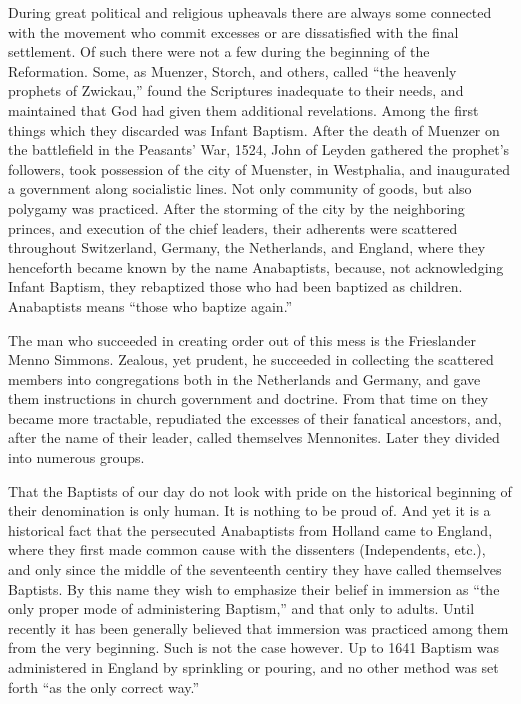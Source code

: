 \documentclass[
]{book}
\begin{document}
During great political and religious upheavals there are always some connected with the movement who commit excesses or are dissatisfied with the final settlement. Of such there were not a few during the beginning of the Reformation. Some, as Muenzer, Storch, and others, called ``the heavenly prophets of Zwickau,'' found the Scriptures inadequate to their needs, and maintained that God had given them additional revelations. Among the first things which they discarded was Infant Baptism. After the death of Muenzer on the battlefield in the Peasants' War, 1524, John of Leyden gathered the prophet's followers, took possession of the city of Muenster, in Westphalia, and inaugurated a government along socialistic lines. Not only community of goods, but also polygamy was practiced. After the storming of the city by the neighboring princes, and execution of the chief leaders, their adherents were scattered throughout Switzerland, Germany, the Netherlands, and England, where they henceforth became known by the name Anabaptists, because, not acknowledging Infant Baptism, they rebaptized those who had been baptized as children. Anabaptists means ``those who baptize again.''

The man who succeeded in creating order out of this mess is the Frieslander Menno Simmons. Zealous, yet prudent, he succeeded in collecting the scattered members into congregations both in the Netherlands and Germany, and gave them instructions in church government and doctrine. From that time on they became more tractable, repudiated the excesses of their fanatical ancestors, and, after the name of their leader, called themselves Mennonites. Later they divided into numerous groups.

That the Baptists of our day do not look with pride on the historical beginning of their denomination is only human. It is nothing to be proud of. And yet it is a historical fact that the persecuted Anabaptists from Holland came to England, where they first made common cause with the dissenters (Independents, etc.), and only since the middle of the seventeenth centiry they have called themselves Baptists. By this name they wish to emphasize their belief in immersion as ``the only proper mode of administering Baptism,'' and that only to adults. Until recently it has been generally believed that immersion was practiced among them from the very beginning. Such is not the case however. Up to 1641 Baptism was administered in England by sprinkling or pouring, and no other method was set forth ``as the only correct way.''
\end{document}
